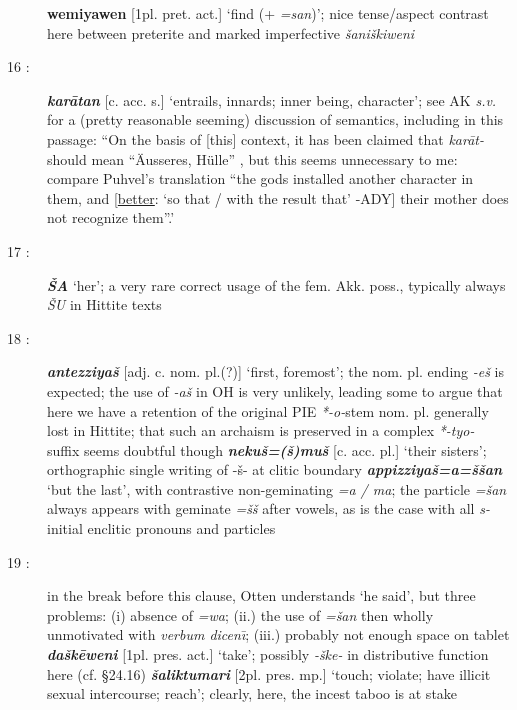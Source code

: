 \documentclass[10pt]{article}
\newcommand{\bit}[1]{\textbf{\textit{#1}}}				%
\newcommand{\p}[1]{{\tiny[{#1}]}}					%
\newcommand{\I}{\={\i}}									%
\newcommand{\hith}{\textsubwedge{h}}
\renewcommand{\.}[1]{\textsubdot{#1}}
\begin{document}
\begin{description}
\textbf{wemiyawen} \p{1pl. pret. act.} `find (+ \textit{=san})'; nice tense/aspect contrast here between preterite and marked imperfective \textit{\v{s}an{\hith}i\v{s}kiweni}

\item[16 :] \bit{kar\=atan} \p{c. acc. s.} `entrails, innards; inner being, character'; see AK \textit{s.v.} for a (pretty reasonable seeming) discussion of semantics, including in this passage: ``On the basis of [this] context, it has been claimed that \textit{kar\=at-} should mean ``\"Ausseres, H\"ulle'' \citep[thus][139]{rieken1999stammbildung}, but this seems unnecessary to me: compare Puhvel's translation ``the gods installed another character in them, and [\underline{better}: `so that / with the result that' -ADY] their mother does not recognize them''.'

\item[17 :] \bit{\v{S}A} `her'; a very rare correct usage of the fem. Akk. poss., typically always \textit{\v{S}U} in Hittite texts

\item[18 :] \bit{{\hith}antezziya\v{s}} \p{adj. c. nom. pl.(?)} `first, foremost'; the nom. pl. ending \textit{-e\v{s}} is expected; the use of \textit{-a\v{s}} in OH is very unlikely, leading some to argue that here we have a retention of the original PIE \textit{*-o-}stem nom. pl. generally lost in Hittite; that such an archaism is preserved in a complex \textit{*-tyo-} suffix seems doubtful though \bit{neku\v{s}=(\v{s})mu\v{s}} \p{c. acc. pl.} `their sisters'; orthographic single writing of -\v{s}- at clitic boundary \bit{appizziya\v{s}=a=\v{s}\v{s}an} `but the last', with contrastive non-geminating \textit{=a / ma}; the particle \textit{=\v{s}an} always appears with geminate \textit{=\v{s}\v{s}} after vowels, as is the case with all \textit{s-}initial enclitic pronouns and particles \citep[cf.][ \S11.4.5, with ref. to \citet{melchert1994ahp} for possible motivation]{kimball1999hhp}

\item[19 :] in the break before this clause, Otten understands `he said', but three problems: (i) absence of \textit{=wa}; (ii.) the use of \textit{=\v{s}an} then wholly unmotivated with \textit{verbum dicen{\I}}; (iii.) probably not enough space on tablet \bit{da\v{s}k\=eweni} \p{1pl. pres. act.} `take'; possibly \textit{-\v{s}ke-} in distributive function here (cf.  \S24.16) \bit{\v{s}aliktumari} \p{2pl. pres. mp.} `touch; violate; have illicit sexual intercourse; reach'; clearly, here, the incest taboo is at stake


\end{description}
\end{document}
